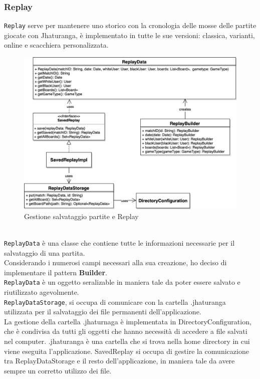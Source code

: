 \documentclass[a4paper,12pt]{report}
\begin{document}
\subsubsection*{Replay}
\texttt{Replay} serve per mantenere uno storico con la cronologia delle mosse delle partite giocate con Jhaturanga, è implementato in tutte le sue versioni: classica, varianti, online e scacchiera personalizzata.
\begin{figure}[H]
    \begin{center}
        \centering
        \includegraphics[width=\textwidth]{img/Tommaso/replay.png}
    \end{center}
    \caption{Gestione salvataggio partite e Replay}
    \label{img:replay}
\end{figure}
\
\\
\texttt{ReplayData} è una classe che contiene tutte le informazioni necessarie per il salvataggio di una partita.\\
Considerando i numerosi campi necessari alla sua creazione, ho deciso di implementare il pattern \textbf{Builder}.\\
\texttt{ReplayData} è un oggetto seralizable in maniera tale da poter essere salvato e riutilizzato agevolmente.\\
\texttt{ReplayDataStorage}, si occupa di comunicare con la cartella .jhaturanga utilizzata per il salvataggio dei file permanenti dell'applicazione.\\
La gestione della cartella .jhaturnaga è implementata in DirectoryConfiguration, che è condivisa da tutti gli oggetti che hanno necessità di accedere a file salvati nel computer. .jhaturanga è una cartella che si trova nella home directory in cui viene eseguita l'applicazione.
SavedReplay si occupa di gestire la comunicazione tra ReplayDataStorage e il resto dell'applicazione, in maniera tale da avere sempre un corretto utilizzo dei file.
\end{document}
